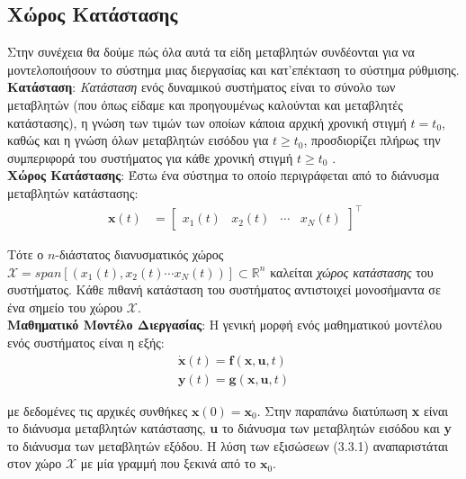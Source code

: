 \documentclass[11pt]{article} %
\numberwithin{equation}{subsection}
\begin{document}
\subsection{Χώρος Κατάστασης}
Στην συνέχεια θα δούμε πώς όλα αυτά τα είδη μεταβλητών συνδέονται για να μοντελοποιήσουν το σύστημα μιας διεργασίας και κατ'επέκταση το σύστημα ρύθμισης.\\

\textbf{Κατάσταση}: \textit{Κατάσταση} ενός δυναμικού συστήματος είναι το σύνολο των μεταβλητών (που όπως είδαμε και προηγουμένως καλούνται και μεταβλητές κατάστασης), η γνώση των τιμών των οποίων κάποια αρχική χρονική στιγμή $t = t_0$, καθώς και η γνώση όλων μεταβλητών εισόδου για $t \geq t_{0}$, προσδιορίζει πλήρως την συμπεριφορά του συστήματος για κάθε χρονική στιγμή $t \geq t_{0}$ \cite{daoutidhs}. \\

\textbf{Χώρος Κατάστασης}: Έστω ένα σύστημα το οποίο περιγράφεται από το διάνυσμα μεταβλητών κατάστασης: 
\begin{align*}
\
\textbf{x}(t) &= \begin{bmatrix}
           x_{1}(t) &
           x_{2}(t) &
           \cdots &
           x_{N}(t)
         \end{bmatrix} 
	  ^ \intercal 
\end{align*}

Τότε ο $n$-διάστατος διανυσματικός χώρος $\mathcal{X} = span[(x_{1}(t), x_{2}(t) \cdots x_{N}(t))] \subset \mathbb{R} ^n$ καλείται \textit{χώρος κατάστασης} του συστήματος. Κάθε πιθανή κατάσταση του συστήματος αντιστοιχεί μονοσήμαντα σε ένα σημείο του χώρου $\mathcal{X}$.\\

\textbf{Μαθηματικό Μοντέλο Διεργασίας}: Η γενική μορφή ενός μαθηματικού μοντέλου ενός συστήματος είναι η εξής:
\begin{equation}
\begin{split}
\dot{\textbf{x}}(t) = \textbf{f}(\textbf{x}, \textbf{u}, t) \\
\textbf{y}(t) = \textbf{g}(\textbf{x}, \textbf{u}, t)
\end{split}
\end{equation}

με δεδομένες τις αρχικές συνθήκες  $\textbf{x}(0) = \textbf{x}_{0}$. Στην παραπάνω διατύπωση \textbf{x} είναι το διάνυσμα μεταβλητών κατάστασης, \textbf{u} το διάνυσμα των μεταβλητών εισόδου και \textbf{y} το διάνυσμα των μεταβλητών εξόδου. Η λύση των εξισώσεων (3.3.1) αναπαριστάται στον χώρο $\mathcal{X}$ με μία γραμμή που ξεκινά από το $\textbf{x}_{0}$. \\
\end{document}
